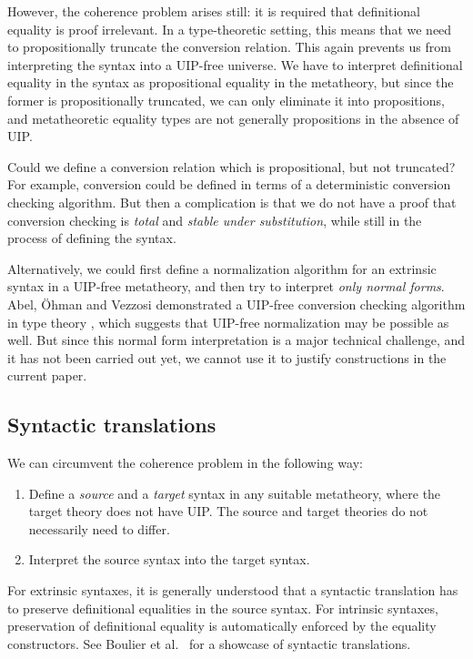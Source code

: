 \documentclass[dvipsnames]{lmcs} %
\newcommand{\1}{\mathsf{1}} \renewcommand{\Pr}{\mathsf{Pr}}
\theoremstyle{plain}\newtheorem{satz}[thm]{Satz} %
\begin{document}
However, the coherence problem arises still: it is required that definitional
equality is proof irrelevant. In a type-theoretic setting, this means that we
need to propositionally truncate the conversion relation. This again prevents us
from interpreting the syntax into a UIP-free universe. We have to interpret
definitional equality in the syntax as propositional equality in the metatheory,
but since the former is propositionally truncated, we can only eliminate it into
propositions, and metatheoretic equality types are not generally propositions in
the absence of UIP.

Could we define a conversion relation which is propositional, but not truncated?
For example, conversion could be defined in terms of a deterministic conversion
checking algorithm. But then a complication is that we do not have a proof that
conversion checking is \emph{total} and \emph{stable under substitution}, while
still in the process of defining the syntax.

Alternatively, we could first define a normalization algorithm for an extrinsic
syntax in a UIP-free metatheory, and then try to interpret \emph{only normal
  forms}. Abel, \"Ohman and Vezzosi demonstrated a UIP-free conversion checking
algorithm in type theory \cite{abel2017decidability}, which suggests that
UIP-free normalization may be possible as well. But since this normal form
interpretation is a major technical challenge, and it has not been carried out
yet, we cannot use it to justify constructions in the current paper.

\subsection{Syntactic translations}
We can circumvent the coherence problem in the following way:
\begin{enumerate}
\item Define a \emph{source} and a \emph{target} syntax in any suitable metatheory,
      where the target theory does not have UIP. The source and target theories
      do not necessarily need to differ.
\item Interpret the source syntax into the target syntax.
\end{enumerate}

For extrinsic syntaxes, it is generally understood that a syntactic translation
has to preserve definitional equalities in the source syntax. For intrinsic
syntaxes, preservation of definitional equality is automatically enforced by the
equality constructors. See Boulier et al.\ \cite{next700} for a showcase of
syntactic translations.
\end{document}

